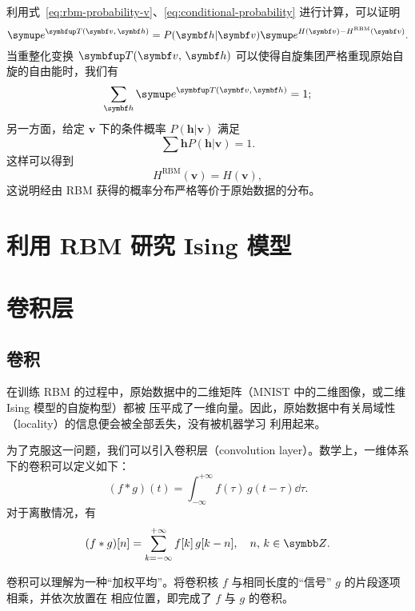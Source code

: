 利用式~\eqref{eq:rbm-probability-v}、\eqref{eq:conditional-probability} 进行计算，可以证明
\begin{equation}
  \ee^{\opT(\bm{v},\,\bm{h})} = P(\bm{h}|\bm{v}) \ee^{H(\bm{v})-H^{\text{RBM}}(\bm{v})}.
\end{equation}
当重整化变换 $\opT(\bm{v},\,\bm{h})$ 可以使得自旋集团严格重现原始自旋的自由能时，我们有
\begin{equation}
  \sum_{\bm{h}} \ee^{\opT(\bm{v},\,\bm{h})} = 1;
\end{equation}
另一方面，给定 $\bm{v}$ 下的条件概率 $P(\bm{h}|\bm{v})$ 满足
\begin{equation}
  \sum{\bm{h}} P(\bm{h}|\bm{v}) = 1.
\end{equation}
这样可以得到
\begin{equation}
  H^{\text{RBM}}(\bm{v}) = H(\bm{v}),
\end{equation}
这说明经由 RBM 获得的概率分布严格等价于原始数据的分布。

\section{利用 RBM 研究 Ising 模型}

\section{卷积层}

\subsection{卷积}

在训练 RBM 的过程中，原始数据中的二维矩阵（MNIST 中的二维图像，或二维 Ising 模型的自旋构型）都被
压平成了一维向量。因此，原始数据中有关局域性（locality）的信息便会被全部丢失，没有被机器学习
利用起来。

为了克服这一问题，我们可以引入卷积层（convolution layer）。数学上，一维体系下的卷积可以定义如下：
\begin{equation}
  \label{eq:convolution-continuous}
  (f \ast g) (t) = \int_{-\infty}^{+\infty} f(\tau) \, g(t-\tau) \dd{\tau}.
\end{equation}
对于离散情况，有
\begin{equation}
  (f \ast g) [n] = \sum_{k=-\infty}^{+\infty} f[k] \, g[k-n] \qc n,\,k \in \Z.
\end{equation}

卷积可以理解为一种“加权平均”。将卷积核 $f$ 与相同长度的“信号” $g$ 的片段逐项相乘，并依次放置在
相应位置，即完成了 $f$ 与 $g$ 的卷积。

